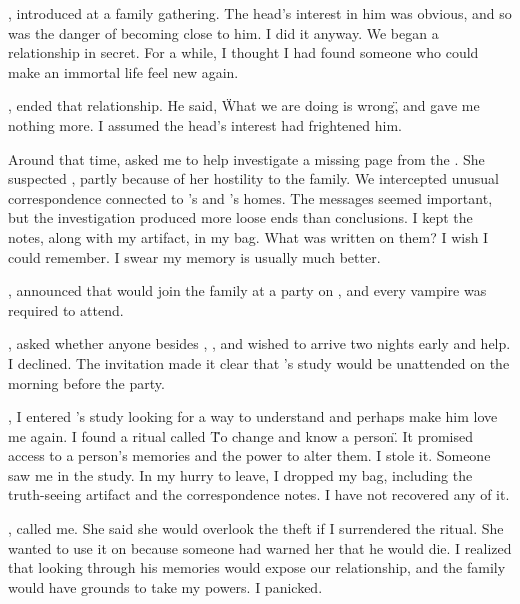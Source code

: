 {,  introduced  at a family gathering. The head's interest in him was obvious, and so was the danger of becoming close to him. I did it anyway. We began a relationship in secret. For a while, I thought I had found someone who could make an immortal life feel new again.

,  ended that relationship. He said, \"What we are doing is wrong\", and gave me nothing more. I assumed the head's interest had frightened him.

Around that time,  asked me to help investigate a missing page from the . She suspected , partly because of her hostility to the family. We intercepted unusual correspondence connected to 's and 's homes. The messages seemed important, but the investigation produced more loose ends than conclusions. I kept the notes, along with my artifact, in my bag. What was written on them? I wish I could remember. I swear my memory is usually much better.

,  announced that  would join the family at a party on , and every vampire was required to attend.

,  asked whether anyone besides , , and  wished to arrive two nights early and help. I declined. The invitation made it clear that 's study would be unattended on the morning before the party.

, I entered 's study looking for a way to understand  and perhaps make him love me again. I found a ritual called \"To change and know a person\". It promised access to a person's memories and the power to alter them. I stole it. Someone saw me in the study. In my hurry to leave, I dropped my bag, including the truth-seeing artifact and the correspondence notes. I have not recovered any of it.

,  called me. She said she would overlook the theft if I surrendered the ritual. She wanted to use it on  because someone had warned her that he would die. I realized that looking through his memories would expose our relationship, and the family would have grounds to take my powers. I panicked.

}
